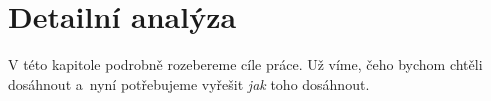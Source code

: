 
\chapter{Detailní analýza}
\label{chap:detailAnal}

V této kapitole podrobně rozebereme cíle práce. Už víme, čeho bychom chtěli dosáhnout a~nyní potřebujeme vyřešit \textit{jak} toho dosáhnout.





















